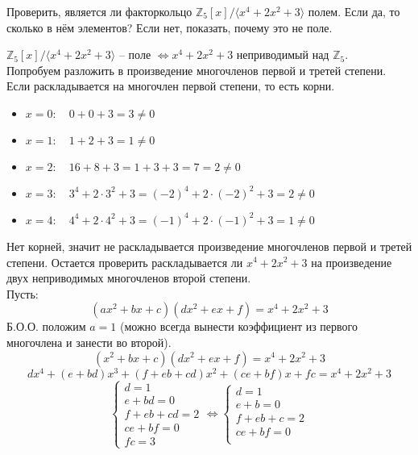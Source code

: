 \begin{problem}
    Проверить, является ли факторкольцо \(\mathbb{Z}_5[x] / \langle x^4 + 2x^2 + 3 \rangle \) полем. Если да, то сколько в нём элементов? Если нет, показать, почему это не поле.
\end{problem}
\begin{solution}
    \(\mathbb{Z}_5[x] / \langle x^4 + 2x^2 + 3 \rangle \) -- поле \(\Longleftrightarrow x^4 + 2x^2 + 3 \) неприводимый над \(\mathbb{Z}_5\). \\
    Попробуем разложить в произведение многочленов первой и третей степени. Если раскладывается на многочлен первой степени, то есть корни.
    \begin{itemize}
        \item \( x = 0: \quad 0 + 0 + 3 = 3 \neq 0\)
        \item \( x = 1: \quad 1 + 2 + 3 = 1 \neq 0\)
        \item \( x = 2: \quad 16 + 8 + 3 = 1 + 3 + 3 = 7 = 2 \neq 0\)
        \item \( x = 3: \quad 3^4 + 2 \cdot 3^2 + 3 = (-2)^4 + 2 \cdot (-2)^2 + 3 = 2 \neq 0 \)
        \item \( x = 4: \quad 4^4 + 2 \cdot 4^2 + 3 = (-1)^4 + 2 \cdot (-1)^2 + 3 = 1 \neq 0\)
    \end{itemize}
    Нет корней, значит не раскладывается произведение многочленов первой и третей степени.
    Остается проверить раскладывается ли \( x^4 + 2x^2 + 3 \) на произведение двух неприводимых многочленов второй степени. \\
    Пусть: \[ (ax^2 + bx + c)(dx^2 + ex + f) = x^4 + 2x^2 + 3 \]
    Б.О.О. положим \(a = 1\) (можно всегда вынести коэффициент из первого многочлена и занести во второй).
    \[ (x^2 + bx + c)(dx^2 + ex + f) = x^4 + 2x^2 + 3 \]
    \[ dx^4 + (e + bd)x^3 + (f + eb + cd)x^2 + (ce + bf)x + fc = x^4 + 2x^2 + 3 \]
    \[ \begin{cases}
        d = 1 \\
        e + bd = 0 \\
        f + eb + cd = 2 \\
        ce + bf = 0 \\
        fc = 3
    \end{cases} \Longleftrightarrow
    \begin{cases}
        d = 1 \\
        e + b = 0 \\
        f + eb + c = 2 \\
        ce + bf = 0 \\

\end{cases}\]
\end{solution}
